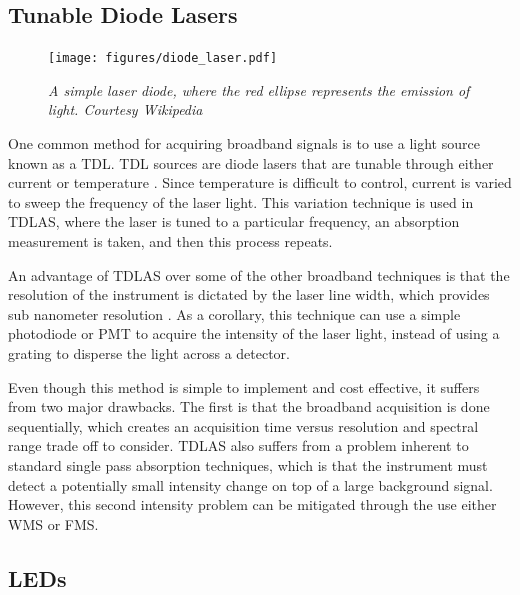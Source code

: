 \subsection{Tunable Diode Lasers}\label{subsec:tdl}

\begin{figure}
\begin{center}
\texttt{[image: figures/diode\_laser.pdf]}
\end{center}
\emph{\footnotesize{A simple laser diode, where the red ellipse represents the emission of light. Courtesy Wikipedia}}
\end{figure}

One common method for acquiring broadband signals is to use a light source
known as a \acf{TDL}. \ac{TDL} sources are diode lasers that are tunable
through either current or temperature \cite{May:1998ue}. Since temperature is
difficult to control, current is varied to sweep the frequency of the laser
light. This variation technique is used in \ac{TDLAS}, where the laser is
tuned to a particular frequency, an absorption measurement is taken, and then
this process repeats.

An advantage of \ac{TDLAS} over some of the other broadband techniques is that
the resolution of the instrument is dictated by the laser line width, which
provides sub nanometer resolution \cite{Berden:2009wk}. As a corollary, this
technique can use a simple photodiode or \ac{PMT} to acquire the intensity of
the laser light, instead of using a grating to disperse the light across a
detector.


Even though this method is simple to implement and cost effective, it suffers
from two major drawbacks. The first is that the broadband acquisition is done
sequentially, which creates an acquisition time versus resolution and spectral
range trade off to consider. \ac{TDLAS} also suffers from a problem inherent
to standard single pass absorption techniques, which is that the instrument
must detect a potentially small intensity change on top of a large background
signal. However, this second intensity problem can be mitigated through the use
either \ac{WMS} \cite{Reid:1981vq} or \ac{FMS}.



\subsection{LEDs}\label{subsec:led}

